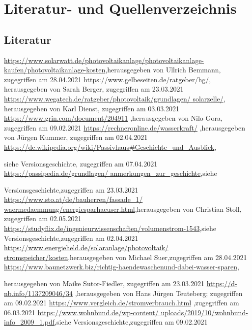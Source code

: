 \section{Literatur- und Quellenverzeichnis }

\renewcommand{\refname}{\large Internetquellen}
\subsection{Literatur}
\begin{thebibliography}{tiefe}


 \url{https://www.solarwatt.de/photovoltaikanlage/photovoltaikanlage-kaufen/photovoltaikanlage-kosten},herausgegeben von Ullrich Bemmann, zugegriffen am 28.04.2021
 \url{https://www.gelbeseiten.de/ratgeber/hg/}, herausgegeben von Sarah
Berger, zugegriffen am 23.03.2021
 \url{https://www.wegatech.de/ratgeber/photovoltaik/grundlagen/
solarzelle/}, herausgegeben von Karl Dienst, zugegriffen am 03.03.2021
 \url{https://www.grin.com/document/204911}
,herausgegeben von Nilo Gora, zugegriffen am 09.02.2021
 \url{https://rechneronline.de/wasserkraft/}
,herausgegeben von Jürgen Kummer, zugegriffen am 02.04.2021
 \url{https://de.wikipedia.org/wiki/Passivhaus#Geschichte_und_Ausblick},\par siehe Versionsgeschichte, zugegriffen am 07.04.2021
 \url{https://passipedia.de/grundlagen/
anmerkungen_zur_geschichte},siehe \par Versionsgeschichte,zugegriffen am 23.03.2021
 \url{https://www.sto.at/de/bauherren/fassade_1/
waermedaemmung/energiesparhaeuser.html},herausgegeben von Christian Stoll, zugegriffen am
02.05.2021
 \url{https://studyflix.de/ingenieurwissenschaften/volumenstrom-1543},siehe Versionsgeschichte,zugegriffen am 02.04.2021
 \url{https://www.energieheld.de/solaranlage/photovoltaik/
stromspeicher/kosten},herausgegeben von Michael Suer,zugegriffen am 28.04.2021
 \url{https://www.baunetzwerk.biz/richtig-haendewaschenund-dabei-wasser-sparen},\par herausgegeben von Maike Sutor-Fiedler, zugegriffen am 23.03.2021
 \url{https://d-nb.info/1137209046/34} ,herausgegeben von
Hans Jürgen Teuteberg; zugegriffen am 09.02.2021
 \url{https://www.vergleich.de/stromverbrauch.html}
,zugegriffen am 06.03.2021
 \url{https://www.wohnbund.de/wp-content/
uploads/2019/10/wohnbund-info_2009_1.pdf},siehe Versionsgeschichte,zugegriffen am 09.02.2021


\end{thebibliography}
